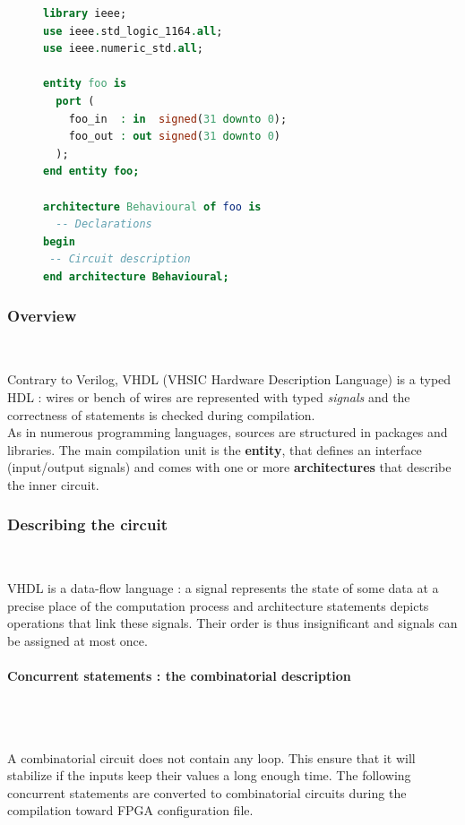 \documentclass[10pt,a4paper]{article}
\renewcommand{\indent}{~\\\vspace{-.8cm}}
\newcommand{\pindent}{~\\\indent}
\begin{document}
\begin{figure}
	\vspace{-35pt}
\begin{lstlisting}[language=VHDL]
library ieee;
use ieee.std_logic_1164.all;
use ieee.numeric_std.all;
	
entity foo is
  port (
	foo_in  : in  signed(31 downto 0);
	foo_out : out signed(31 downto 0)
  );
end entity foo;
	
architecture Behavioural of foo is
  -- Declarations
begin
 -- Circuit description
end architecture Behavioural;
\end{lstlisting}
\end{figure}

\subsubsection{Overview}\indent

Contrary to Verilog, VHDL (VHSIC Hardware Description Language) is a typed HDL : wires or bench of wires are represented with typed \textit{signals} and the correctness of statements is checked during compilation.\\

As in numerous programming languages, sources are structured in packages and libraries.
The main compilation unit is the \textbf{entity}, that defines an interface (input/output signals) and comes with one or more \textbf{architectures} that describe the inner circuit.


\subsubsection{Describing the circuit} \indent

VHDL is a data-flow language : a signal represents the state of some data at a precise place of the computation process and architecture statements depicts operations that link these signals. Their order is thus insignificant and signals can be assigned at most once.


\paragraph{Concurrent statements : the combinatorial description} \pindent
\label{Concurr}

A combinatorial circuit does not contain any loop. This ensure that it will stabilize if the inputs keep their values a long enough time. The following concurrent statements are converted to combinatorial circuits during the compilation toward FPGA configuration file.
\end{document}
